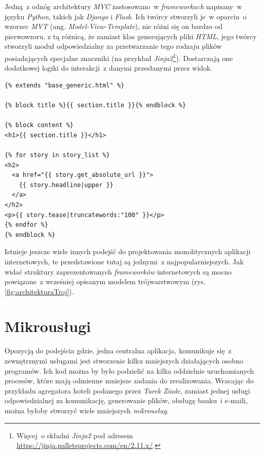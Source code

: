 Jedną~z odnóg architektury \textit{MVC} zastosowano~w \textit{frameworkach} napisany~w języku \textit{Python}, takich jak \textit{Django} i \textit{Flask}. Ich twórcy stworzyli je~w oparciu~o wzorzec \textit{MVT} (ang. \textit{Model-View-Template})\cite{django}, nie różni się on bardzo od pierwowzoru, z tą różnicą, że zamiast klas generujących pliki \textit{HTML}, jego twórcy stworzyli moduł odpowiedzialny za przetwarzanie tego rodzaju plików posiadających specjalne znaczniki (na przykład \textit{Jinja2}\footnote{Więcej~o składni \textit{Jinja2} pod adresem \url{https://jinja.palletsprojects.com/en/2.11.x/}.}). Dostarczają one dodatkowej logiki do interakcji~z danymi przesłanymi przez widok.

\begin{lstlisting}[caption={Przykład szablonu \textit{Django}. Plik \textit{index.html}. Żródło \cite{django}}] 
{% extends "base_generic.html" %}

{% block title %}{{ section.title }}{% endblock %}

{% block content %}
<h1>{{ section.title }}</h1>

{% for story in story_list %}
<h2>
  <a href="{{ story.get_absolute_url }}">
    {{ story.headline|upper }}
  </a>
</h2>
<p>{{ story.tease|truncatewords:"100" }}</p>
{% endfor %}
{% endblock %}
\end{lstlisting}
Istnieje jeszcze wiele innych podejść do projektowania monolitycznych aplikacji internetowych, te przedstawione tutaj są jednymi~z najpopularniejszych. Jak widać struktury zaprezentowanych \textit{frameworków} internetowych są mocno powiązane~z wcześniej opisanym modelem trójwarstwowym (rys. \ref{fig:architekturaTroj}).

\section{Mikrousługi}
Opozycją do podejścia gdzie, jedna centralna aplikacja, komunikuje się~z zewnętrznymi usługami jest stworzenie kilku mniejszych działających osobno programów. Ich kod można by było podzielić na kilka oddzielnie uruchamianych procesów, które mają odmienne mniejsze zadania do zrealizowania\cite{Ziade:2018}. Wracając do przykładu agregatora hoteli podanego przez \textit{Tarek Ziade}, zamiast jednej usługi odpowiedzialnej za komunikację, generowanie plików, obsługę banku~i e-maili, można byłoby stworzyć wiele mniejszych \textit{mikrousług}.
	
